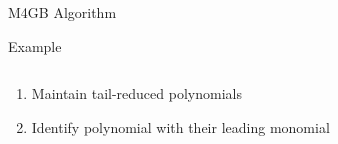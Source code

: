 \documentclass{beamer}
\begin{document}
\begin{section}{M4GB Algorithm}
\begin{frame}{Example}
\begin{columns}[T]
\begin{column}
\begin{scriptsize}
          \vspace{5mm}
        \end{scriptsize}
      \end{column}
    \end{columns}
  \end{frame}

  \begin{frame}
    \begin{enumerate}
    \item Maintain tail-reduced polynomials
    \item Identify polynomial with their leading monomial
    \end{enumerate}
  \end{frame}


\end{section}
\end{document}

